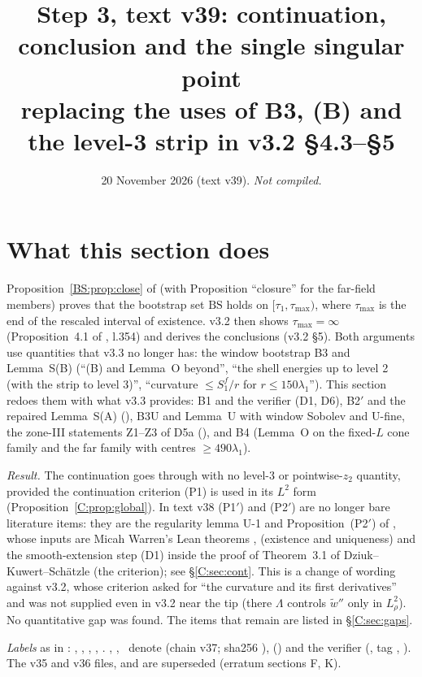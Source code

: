 \documentclass[11pt]{article}
\title{Step 3, text v39: continuation, conclusion and the single singular point\\[2pt]\large replacing the uses of B3, (B) and the level-3 strip in v3.2 \S4.3--\S5}
\author{}\date{20 November 2026 (text v39). \emph{Not compiled.}}
\begin{document}
\maketitle
\fi

\section{What this section does}\label{C:sec:intro}
Proposition~\ref{BS:prop:close} of  (with  Proposition ``closure'' for the far-field members) proves that the bootstrap set $\mathrm{BS}$ holds on $[\tau_1,\tau_{\max})$, where $\tau_{\max}$ is the end of the rescaled interval of existence. v3.2 then shows $\tau_{\max}=\infty$ (Proposition~4.1 of , l.354) and derives the conclusions (v3.2 \S5). Both arguments use quantities that v3.3 no longer has: the window bootstrap B3 and Lemma~S(B) (``(B) and Lemma~O beyond'', ``the shell energies up to level 2 (with the strip to level 3)'', ``curvature $\le S_1^f/r$ for $r\le150\lambda_1$''). This section redoes them with what v3.3 provides: B1 and the verifier (D1, D6), B2$'$ and the repaired Lemma~S(A) (), B3U and Lemma~U with window Sobolev and U-fine, the zone-III statements Z1--Z3 of D5a (), and B4 (Lemma~O on the fixed-$L$ cone family and the far family with centres $\ge490\lambda_1$).

\noindent\emph{Result.} The continuation goes through with no level-3 or pointwise-$z_2$ quantity, provided the continuation criterion (P1) is used in its $L^2$ form (Proposition~\ref{C:prop:global}). In text v38 (P1$'$) and (P2$'$) are no longer bare literature items: they are the regularity lemma U-1 and Proposition~(P2$'$) of  \tH, whose inputs are Micah Warren's Lean theorems ,  \cite{CWFlow} (existence and uniqueness) and the smooth-extension step (D1) inside the proof of Theorem~3.1 of Dziuk--Kuwert--Sch\"atzle \cite{DKS2002} (the criterion); see \S\ref{C:sec:cont}. This is a change of wording against v3.2, whose criterion asked for ``the curvature and its first derivatives'' and was not supplied even in v3.2 near the tip (there $\Lambda$ controls $\tilde w''$ only in $L^2_\rho$). No quantitative gap was found. The items that remain are listed in \S\ref{C:sec:gaps}.

\noindent\emph{Labels} as in : \tC, \tP, \tH, \tE, \tB. \SU, \SZ, \SV\ denote  (chain v37; sha256 ),  () and the verifier  (, tag , ). The v35 and v36 files,  and  are superseded (erratum sections F, K).
\end{document}
